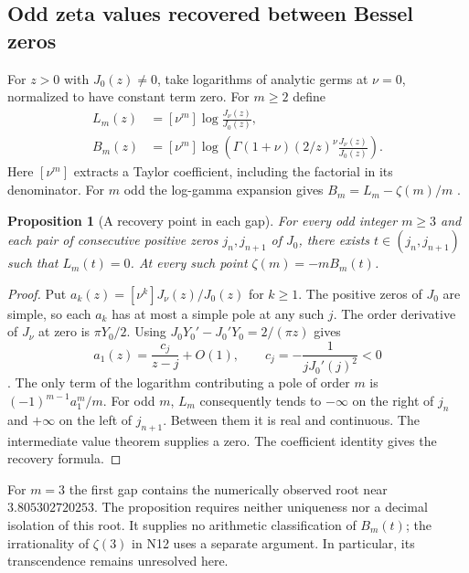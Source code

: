 \documentclass[11pt,a4paper]{article}
\newtheorem{proposition}[theorem]{Proposition}
\theoremstyle{definition}
\theoremstyle{remark}
\begin{document}
\subsection{Odd zeta values recovered between Bessel zeros}\label{sec:odd}
For $z>0$ with $J_0(z)\ne0$, take logarithms of analytic germs at $\nu=0$, normalized to have constant term zero. For $m\ge2$ define
\begin{align*}
 L_m(z)&=[\nu^m]\log\frac{J_\nu(z)}{J_0(z)},\\
 B_m(z)&=[\nu^m]\log\!\left(\Gamma(1+\nu)(2/z)^\nu
                          \frac{J_\nu(z)}{J_0(z)}\right).
\end{align*}
Here $[\nu^m]$ extracts a Taylor coefficient, including the factorial in its denominator. For $m$ odd the log-gamma expansion gives $B_m=L_m-\zeta(m)/m$ \cite[\S5.7]{aDLMF}.
\begin{proposition}[A recovery point in each gap]\label{prop:odd}
For every odd integer $m\ge3$ and each pair of consecutive positive zeros $j_n,j_{n+1}$ of $J_0$, there exists $t\in(j_n,j_{n+1})$ such that $L_m(t)=0$. At every such point $\zeta(m)=-mB_m(t)$.
\end{proposition}
\begin{proof}
Put $a_k(z)=[\nu^k]J_\nu(z)/J_0(z)$ for $k\ge1$. The positive zeros of $J_0$ are simple, so each $a_k$ has at most a simple pole at any such $j$. The order derivative of $J_\nu$ at zero is $\pi Y_0/2$. Using $J_0Y_0'-J_0'Y_0=2/(\pi z)$ gives
\[
 a_1(z)=\frac{c_j}{z-j}+O(1),\qquad c_j=-\frac{1}{jJ_0'(j)^2}<0
\]
\cite[\S\S10.5, 10.15, 10.21]{aDLMF}. The only term of the logarithm contributing a pole of order $m$ is $(-1)^{m-1}a_1^m/m$. For odd $m$, $L_m$ consequently tends to $-\infty$ on the right of $j_n$ and $+\infty$ on the left of $j_{n+1}$. Between them it is real and continuous. The intermediate value theorem supplies a zero. The coefficient identity gives the recovery formula.
\end{proof}
For $m=3$ the first gap contains the numerically observed root near $3.805302720253$. The proposition requires neither uniqueness nor a decimal isolation of this root. It supplies no arithmetic classification of $B_m(t)$; the irrationality of $\zeta(3)$ in N12 uses a separate argument. In particular, its transcendence remains unresolved here.
\end{document}
